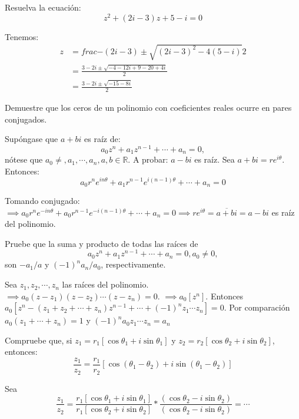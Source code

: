 \begin{ejemplo}
    Resuelva la ecuación:
    $$z^2 +(2i-3)z+5-i=0$$
    \begin{sol}
        Tenemos: 
        \begin{align*}
            z &=frac{-(2i-3)\pm \sqrt{(2i-3)^2 -4(5-i)}}{2}\\
            &= \frac{3-2i \pm \sqrt{-4-12i+9-20+4i}}{2}\\
            &= \frac{3-2i \pm \sqrt{-15-8i}}{2}
        \end{align*}
    \end{sol}
\end{ejemplo}

\begin{ejemplo}
    Demuestre que los ceros de un polinomio con coeficientes reales ocurre en pares conjugados.\begin{dem}
        Supóngase que $a+bi$ es raíz de: 
        $$a_0z^n + a_1z^{n-1}+\cdots + a_n = 0,$$
        nótese que $a_0\neq, a_1,\cdots, a_n,a,b\in \mathbb{R}$. A probar: $a-bi$ es raíz. Sea $a+bi = re^{i\theta}$. Entonces: 
        $$a_0r^ne^{in\theta}+a_1r^{n-1}e^{i(n-1)\theta}+\cdots + a_n=0$$

       Tomando conjugado: 
       $\implies a_0 r^n e^{-in\theta}+a_0r^{n-1}e^{-i(n-1)\theta}+\cdots + a_n =0\implies re^{i\theta}=\overline{a+bi}=a-bi$ es raíz del polinomio.
    \end{dem}
\end{ejemplo}

\begin{ejemplo}
    Pruebe que la suma y producto de todas las raíces de 
    $$a_0z^n + a_1z^{n-1}+\cdots + a_n =0, a_0\neq 0,$$
    son $-a_1/a$ y $(-1)^na_n/a_0$, respectivamente. 
    \begin{dem}
        Sea $z_1,z_2,\cdots, z_n$ las raíces del polinomio. $\implies a_0(z-z_1)(z-z_2)\cdots (z-z_n)=0$.
        $\implies a_0\left[z^n\right]$. Entonces 
        $a_0\left[z^n - (z_1+z_2+\cdots + z_n)z^{n-1}+\cdots + (-1)^n z_1\cdots z_n\right]=0$. Por comparación 
        $a_0(z_1+\cdots + z_n)=1$ y $(-1)^na_0 z_1\cdots z_n=a_n$
    \end{dem}
\end{ejemplo}

\begin{ejemplo}
    Compruebe que, si $z_1=r_1\left[\cos \theta_1+i\sin \theta_1\right]$ y $z_2 = r_2\left[\cos \theta_2 + i\sin \theta_2\right]$, entonces: 
    $$\frac{z_1}{z_2}=\frac{r_1}{r_2}\left[\cos (\theta_1-\theta_2)+i\sin(\theta_1-\theta_2)\right]$$
    \begin{dem}
        Sea 
        $$\frac{z_1}{z_2}=\frac{r_1[\cos\theta_1+ i\sin \theta_1]}{r_1[\cos\theta_2+i\sin \theta_2]}*\frac{(\cos\theta_2 -i\sin \theta_2)}{(\cos \theta_2 -i\sin \theta_2)} = \cdots $$
    \end{dem}
\end{ejemplo}

